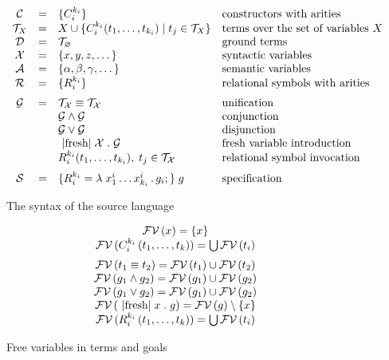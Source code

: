 \begin{figure}[t]
\centering
\[
\begin{array}{ccll}
  \mathcal{C} & = & \{C_i^{k_i}\} & \mbox{constructors with arities} \\
  \mathcal{T}_X & = & X \cup \{C_i^{k_i} (t_1, \dots, t_{k_i}) \mid t_j\in\mathcal{T}_X\} & \mbox{terms over the set of variables $X$} \\
  \mathcal{D} & = & \mathcal{T}_\emptyset & \mbox{ground terms}\\
  \mathcal{X} & = & \{ x, y, z, \dots \} & \mbox{syntactic variables} \\
  \mathcal{A} & = & \{ \alpha, \beta, \gamma, \dots \} & \mbox{semantic variables} \\
  \mathcal{R} & = & \{ R_i^{k_i}\} &\mbox{relational symbols with arities} \\[2mm]
  \mathcal{G} & = & \mathcal{T_X}\equiv\mathcal{T_X}   &  \mbox{unification} \\
              &   & \mathcal{G}\wedge\mathcal{G}     & \mbox{conjunction} \\
              &   & \mathcal{G}\vee\mathcal{G}       &\mbox{disjunction} \\
              &   & \mbox{\lstinline|fresh|}\;\mathcal{X}\;.\;\mathcal{G} & \mbox{fresh variable introduction} \\
              &   & R_i^{k_i} (t_1,\dots,t_{k_i}),\;t_j\in\mathcal{T_X} & \mbox{relational symbol invocation} \\[2mm]
  \mathcal{S} & = & \{R_i^{k_i} = \lambda\;x_1^i\dots x_{k_i}^i\,.\, g_i;\}\; g & \mbox{specification}
\end{array}
\]
\caption{The syntax of the source language}
\label{syntax}
\end{figure}

\begin{figure}[t]
\centering
\[
\begin{array}{c}
  \mathcal{FV}\,(x)=\{x\}\\
  \mathcal{FV}\,(C_i^{k_i}\,(t_1,\dots,t_k))=\bigcup\mathcal{FV}\,(t_i)\\[2mm]
  \mathcal{FV}\,(t_1\equiv t_2)=\mathcal{FV}\,(t_1)\cup\mathcal{FV}\,(t_2)\\
  \mathcal{FV}\,(g_1\wedge g_2)=\mathcal{FV}\,(g_1)\cup\mathcal{FV}\,(g_2)\\
  \mathcal{FV}\,(g_1\vee g_2)=\mathcal{FV}\,(g_1)\cup\mathcal{FV}\,(g_2)\\
  \mathcal{FV}\,(\mbox{\lstinline|fresh|}\;x\;.\;g)=\mathcal{FV}\,(g)\setminus\{x\}\\
  \mathcal{FV}\,(R_i^{k_i}\,(t_1,\dots,t_k))=\bigcup\mathcal{FV}\,(t_i)
\end{array}
\]
\caption{Free variables in terms and goals}
\label{free}
\end{figure}

